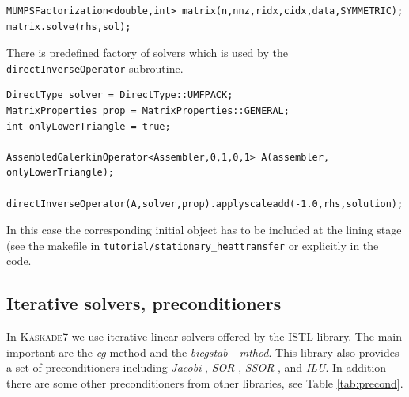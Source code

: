 \documentclass[11pt]{article}
\newcommand{\K}{\textsc{Kaskade7 }}
\begin{document}
\begin{lstlisting}
MUMPSFactorization<double,int> matrix(n,nnz,ridx,cidx,data,SYMMETRIC);
matrix.solve(rhs,sol);
\end{lstlisting}

There is predefined factory of solvers which is used by the {\tt directInverseOperator} subroutine.

\begin{lstlisting}
DirectType solver = DirectType::UMFPACK;
MatrixProperties prop = MatrixProperties::GENERAL;
int onlyLowerTriangle = true;

AssembledGalerkinOperator<Assembler,0,1,0,1> A(assembler, onlyLowerTriangle);

directInverseOperator(A,solver,prop).applyscaleadd(-1.0,rhs,solution);
\end{lstlisting}

In this case the corresponding initial object has to be included at the lining stage 
(see the makefile in {\tt tutorial/stationary\_heattransfer} or explicitly in the code.


\subsection{Iterative solvers, preconditioners}
In \K we use iterative linear solvers offered by the \dune ISTL library. The main important are
the {\em cg}-method and the {\em bicgstab - mthod}. This library also provides a set of
preconditioners including {\em Jacobi}-, {\em SOR}-, {\em SSOR} , and {\em ILU}.
In addition there are some other preconditioners from other libraries, see Table \ref{tab:precond}.

\begin{table}[ht]
\caption{Some available preconditioners\label{tab:precond}}
\end{table}
\end{document}
